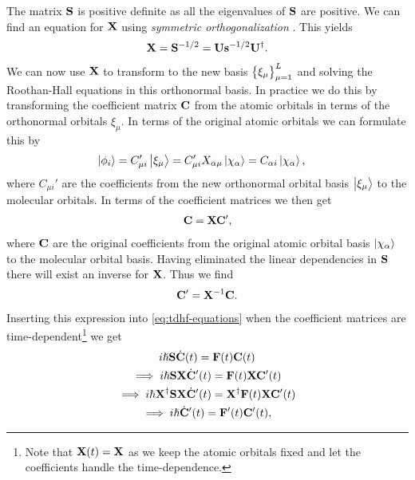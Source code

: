         The matrix $\mathbf{S}$ is positive definite as all the eigenvalues of
        $\mathbf{S}$ are positive.
        We can find an equation for $\mathbf{X}$ using \emph{symmetric
        orthogonalization} \cite{mayer2002lowdin}.
        This yields
        \begin{align}
            \mathbf{X} = \mathbf{S}^{-1/2} = \mathbf{U}\mathbf{s}^{-1/2}\mathbf{U}^{\dagger}.
        \end{align}
        We can now use $\mathbf{X}$ to transform to the new basis
        $\left\{ \xi_{\mu} \right\}_{\mu = 1}^{L}$ and solving the Roothan-Hall equations
        in this orthonormal basis. In practice we do this by transforming the
        coefficient matrix $\mathbf{C}$ from the atomic orbitals in terms of the
        orthonormal orbitals $\xi_{\mu}$. In terms of the original atomic
        orbitals we can formulate this by
        \begin{align}
            \ket{\phi_i}
            &= C_{\mu i}'\ket{\xi_{\mu}}
            = C_{\mu i}'X_{\alpha \mu}\ket{\chi_{\alpha}}
            = C_{\alpha i}\ket{\chi_{\alpha}},
        \end{align}
        where $C_{\mu i}'$ are the coefficients from the new orthonormal orbital
        basis $\ket{\xi_{\mu}}$ to the molecular orbitals. In terms of the
        coefficient matrices we then get
        \begin{align}
            \mathbf{C} = \mathbf{X}\mathbf{C}',
        \end{align}
        where $\mathbf{C}$ are the original coefficients from the original atomic
        orbital basis $\ket{\chi_{\alpha}}$ to the molecular orbital basis.
        Having eliminated the linear dependencies in $\mathbf{S}$ there will exist
        an inverse for $\mathbf{X}$. Thus we find
        \begin{align}
            \mathbf{C}' = \mathbf{X}^{-1}\mathbf{C}.
        \end{align}
        Inserting this expression into \autoref{eq:tdhf-equations} when the
        coefficient matrices are time-dependent\footnote{Note that $\mathbf{X}(t) =
        \mathbf{X}$ as we keep the atomic orbitals fixed and let the coefficients
        handle the time-dependence.} we get
        \begin{gather}
            i\hslash\mathbf{S}\dot{\mathbf{C}}(t) = \mathbf{F}(t)\mathbf{C}(t) \\
            \implies
            i\hslash\mathbf{S}\mathbf{X}\dot{\mathbf{C}}'(t) = \mathbf{F}(t)\mathbf{X}\mathbf{C}'(t)
            \\
            \implies
            i\hslash\mathbf{X}^{\dagger}\mathbf{S}\mathbf{X}\dot{\mathbf{C}}'(t)
            = \mathbf{X}^{\dagger}\mathbf{F}(t)\mathbf{X}\mathbf{C}'(t)
            \\
            \implies
            i\hslash \dot{\mathbf{C}}'(t) = \mathbf{F}'(t)\mathbf{C}'(t),
        \end{gather}
